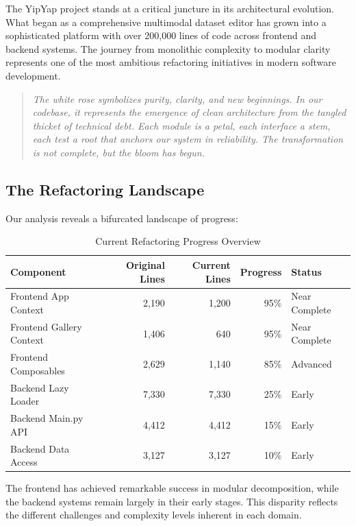 \documentclass[11pt]{article}
\begin{document}
The YipYap project stands at a critical juncture in its architectural evolution. What began as a comprehensive multimodal dataset editor has grown into a sophisticated platform with over 200,000 lines of code across frontend and backend systems. The journey from monolithic complexity to modular clarity represents one of the most ambitious refactoring initiatives in modern software development.

\begin{quote}
\emph{The white rose symbolizes purity, clarity, and new beginnings. In our codebase, it represents the emergence of clean architecture from the tangled thicket of technical debt. Each module is a petal, each interface a stem, each test a root that anchors our system in reliability. The transformation is not complete, but the bloom has begun.}
\end{quote}

\subsection{The Refactoring Landscape}

Our analysis reveals a bifurcated landscape of progress:

\begin{table}[h]
\centering
\begin{tabular}{|l|r|r|r|l|}
\hline
\textbf{Component} & \textbf{Original Lines} & \textbf{Current Lines} & \textbf{Progress} & \textbf{Status} \\
\hline
Frontend App Context & 2,190 & 1,200 & 95\% & Near Complete \\
Frontend Gallery Context & 1,406 & 640 & 95\% & Near Complete \\
Frontend Composables & 2,629 & 1,140 & 85\% & Advanced \\
Backend Lazy Loader & 7,330 & 7,330 & 25\% & Early \\
Backend Main.py API & 4,412 & 4,412 & 15\% & Early \\
Backend Data Access & 3,127 & 3,127 & 10\% & Early \\
\hline
\end{tabular}
\caption{Current Refactoring Progress Overview}
\label{tab:current-progress-overview}
\end{table}

The frontend has achieved remarkable success in modular decomposition, while the backend systems remain largely in their early stages. This disparity reflects the different challenges and complexity levels inherent in each domain.
\end{document}
